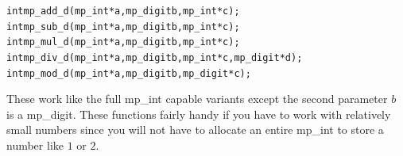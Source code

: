 \documentclass[synpaper]{book}
\begin{document}
    
\begin{alltt}
int mp_add_d(mp_int *a, mp_digit b, mp_int *c);
int mp_sub_d(mp_int *a, mp_digit b, mp_int *c);
int mp_mul_d(mp_int *a, mp_digit b, mp_int *c);
int mp_div_d(mp_int *a, mp_digit b, mp_int *c, mp_digit *d);
int mp_mod_d(mp_int *a, mp_digit b, mp_digit *c);
\end{alltt}

These work like the full mp\_int capable variants except the second parameter $b$ is a mp\_digit.  These
functions fairly handy if you have to work with relatively small numbers since you will not have to allocate
an entire mp\_int to store a number like $1$ or $2$.


\end{document}
